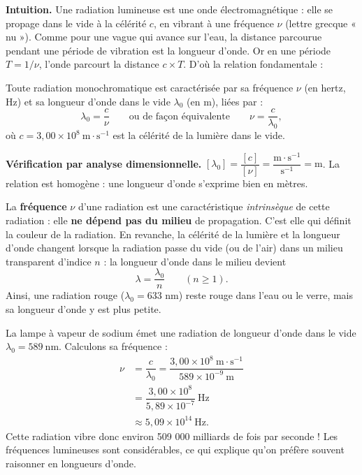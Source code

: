 \documentclass[11pt]{article}
\newcommand{\cle}[1]{{\popxbold\color{popdark}#1}}
\begin{document}
\textbf{Intuition.} Une radiation lumineuse est une onde électromagnétique : elle se propage dans le vide à la célérité $c$, en vibrant à une fréquence $\nu$ (lettre grecque « nu »). Comme pour une vague qui avance sur l'eau, la distance parcourue pendant une période de vibration est la longueur d'onde. Or en une période $T = 1/\nu$, l'onde parcourt la distance $c \times T$. D'où la relation fondamentale :

\begin{propriete}
Toute radiation monochromatique est caractérisée par sa \cle{fréquence} $\nu$ (en hertz, Hz) et sa \cle{longueur d'onde dans le vide} $\lambda_0$ (en m), liées par :
\[ \boxed{\lambda_0 = \dfrac{c}{\nu}} \qquad \text{ou de façon équivalente} \qquad \nu = \dfrac{c}{\lambda_0}, \]
où $c = 3{,}00 \times 10^{8}\ \text{m}\cdot\text{s}^{-1}$ est la célérité de la lumière dans le vide.
\end{propriete}

\textbf{Vérification par analyse dimensionnelle.} $[\lambda_0] = \dfrac{[c]}{[\nu]} = \dfrac{\text{m}\cdot\text{s}^{-1}}{\text{s}^{-1}} = \text{m}$. La relation est homogène : une longueur d'onde s'exprime bien en mètres.

\begin{propriete}
La \textbf{fréquence} $\nu$ d'une radiation est une caractéristique \emph{intrinsèque} de cette radiation : elle \textbf{ne dépend pas du milieu} de propagation. C'est elle qui définit la couleur de la radiation. En revanche, la célérité de la lumière et la longueur d'onde changent lorsque la radiation passe du vide (ou de l'air) dans un milieu transparent d'indice $n$ : la longueur d'onde dans le milieu devient
\[ \lambda = \dfrac{\lambda_0}{n} \qquad (n \geq 1). \]
Ainsi, une radiation rouge ($\lambda_0 = 633$ nm) reste rouge dans l'eau ou le verre, mais sa longueur d'onde y est plus petite.
\end{propriete}

\begin{exemplebox}
La lampe à vapeur de sodium émet une radiation de longueur d'onde dans le vide $\lambda_0 = 589\ \text{nm}$. Calculons sa fréquence :
\begin{align*}
\nu &= \dfrac{c}{\lambda_0} = \dfrac{3{,}00 \times 10^{8}\ \text{m}\cdot\text{s}^{-1}}{589 \times 10^{-9}\ \text{m}} \\
&= \dfrac{3{,}00 \times 10^{8}}{5{,}89 \times 10^{-7}}\ \text{Hz} \\
&\approx 5{,}09 \times 10^{14}\ \text{Hz}.
\end{align*}
Cette radiation vibre donc environ 509 000 milliards de fois par seconde ! Les fréquences lumineuses sont considérables, ce qui explique qu'on préfère souvent raisonner en longueurs d'onde.
\end{exemplebox}
\end{document}
